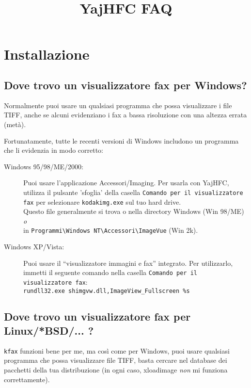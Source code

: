 \documentclass[a4paper,10pt]{scrartcl}
\title{YajHFC FAQ}
\author{}
\date{}
\begin{document}
\sloppy

\maketitle

\tableofcontents

\section{Installazione}
\subsection{Dove trovo un visualizzatore fax per Windows?}

Normalmente puoi usare un qualsiasi programma che possa visualizzare i file TIFF, anche
se alcuni evidenziano i fax a bassa risoluzione con una altezza errata (metà).

Fortunatamente, tutte le recenti versioni di Windows includono un programma che li
evidenzia in modo corretto:

\begin{description}
\item[Windows 95/98/ME/2000:]
 Puoi usare l'applicazione Accessori/Imaging.
      Per usarla con YajHFC, utilizza il pulsante 'sfoglia' della casella
      \texttt{Comando per il visualizzatore fax} per selezionare \texttt{kodakimg.exe}
      sul tuo hard drive.\\
      Questo file generalmente si trova o nella directory Windows (Win 98/ME) \emph{o} \\
      in \verb.Programmi\Windows NT\Accessori\ImageVue. (Win 2k).
       
\item[Windows XP/Vista:]
Puoi usare il ``visualizzatore immagini e fax'' integrato.
      Per utilizzarlo, immetti il seguente comando nella casella \texttt{Comando per il visualizzatore fax}:\\
      \verb#rundll32.exe shimgvw.dll,ImageView_Fullscreen %s#
 \end{description}

      
\subsection{Dove trovo un visualizzatore fax per Linux/*BSD/... ?}
\texttt{kfax} funzioni bene per me, ma così come per Windows, puoi usare qualsiasi programma che 
possa visualizzare file TIFF, basta cercare nel database dei pacchetti della tua distribuzione 
(in ogni caso, xloadimage \emph{non} mi funziona correttamente).
\end{document}

